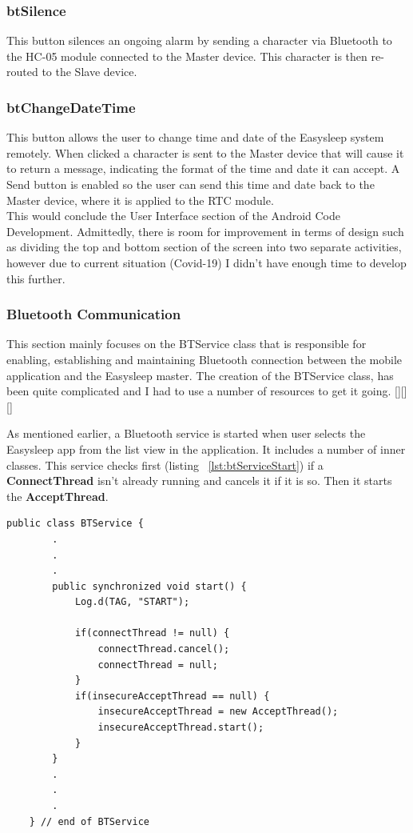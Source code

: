 \documentclass[12pt,a4paper]{article}
\begin{document}
    \subsubsection*{btSilence}
    This button silences an ongoing alarm by sending a character via Bluetooth to the HC-05 module connected to the Master device. This character is then re-routed to the Slave device.
    
    \subsubsection*{btChangeDateTime}
    This button allows the user to change time and date of the Easysleep system remotely. When clicked a character is sent to the Master device that will cause it to return a message, indicating the format of the time and date it can accept. A Send button is enabled so the user can send this time and date back to the Master device, where it is applied to the RTC module. \\
    
    This would conclude the User Interface section of the Android Code Development. Admittedly, there is room for improvement in terms of design such as dividing the top and bottom section of the screen into two separate activities, however due to current situation (Covid-19) I didn't have enough time to develop this further. \\
    
   \subsubsection{Bluetooth Communication}\label{section:btCommunication}
   This section mainly focuses on the BTService class that is responsible for enabling, establishing and maintaining Bluetooth connection between the mobile application and the Easysleep master. The creation of the BTService class, has been quite complicated and I had to use a number of resources to get it going. [][][]
   
   As mentioned earlier, a Bluetooth service is started when user selects the Easysleep app from the list view in the application. It includes a number of inner classes. This service checks first (listing ~\ref{lst:btServiceStart}) if a {\bfseries ConnectThread} isn't already running and cancels it if it is so. Then it starts the {\bfseries AcceptThread}.
   
   \begin{lstlisting}[label={lst:btServiceStart}, caption=BTService start()]
   public class BTService {
        .
        .
        .   
        public synchronized void start() {
            Log.d(TAG, "START");

            if(connectThread != null) {
                connectThread.cancel();
                connectThread = null;
            }
            if(insecureAcceptThread == null) {
                insecureAcceptThread = new AcceptThread();
                insecureAcceptThread.start();
            }
        }
        .
        .
        .
    } // end of BTService
    \end{lstlisting}
    
\end{document}
